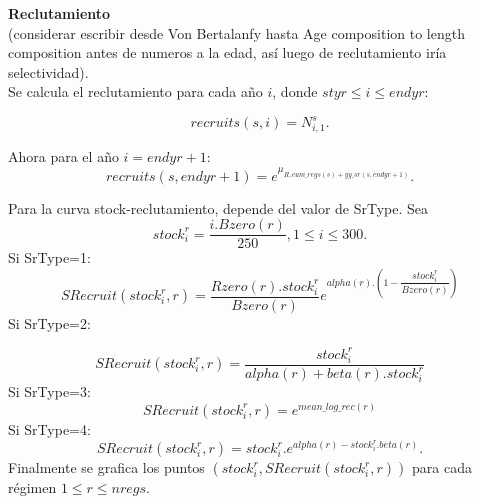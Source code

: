\documentclass{article}
\begin{document}
\textbf{Reclutamiento}\\
(considerar escribir desde Von Bertalanfy hasta Age composition to length composition antes de numeros a la edad, así luego de reclutamiento iría selectividad).\\

Se calcula el reclutamiento para cada año $i$, donde $styr\leq i \leq endyr$:

\begin{equation}
    recruits(s,i)=N^s_{i,1}.
\end{equation}

Ahora para el año $i=endyr+1$:
\begin{equation}
    recruits(s,endyr+1)=e^{\mu_{R,cum\_regs(s)+yy\_sr(s,endyr+1)}}.
\end{equation}

Para la curva stock-reclutamiento, depende del valor de SrType. Sea 
\begin{equation}
    stock^r_i=\dfrac{i.Bzero(r)}{250}, 1\leq i \leq 300.
\end{equation}
Si SrType=1:
\begin{equation}
SRecruit(stock^r_i,r)=\dfrac{Rzero(r).stock^r_i}{Bzero(r)}e^{alpha(r).\left(1-\dfrac{stock^r_i}{Bzero(r)}\right)}
\end{equation}
Si SrType=2:

\begin{equation}
SRecruit(stock^r_i,r)=\dfrac{stock^r_i}{alpha(r)+beta(r).stock^r_i}
        \end{equation}
Si SrType=3:
\begin{equation}
SRecruit(stock^r_i,r)=e^{mean\_log\_rec(r)}
\end{equation}
Si SrType=4:
\begin{equation}
SRecruit(stock^r_i,r) =  stock^r_i.e^{alpha(r)-stock^r_i.beta(r)}.
\end{equation}
Finalmente se grafica los puntos $(stock^r_i, SRecruit(stock^r_i,r))$ para cada régimen $1\leq r \leq nregs$.







\end{document}
